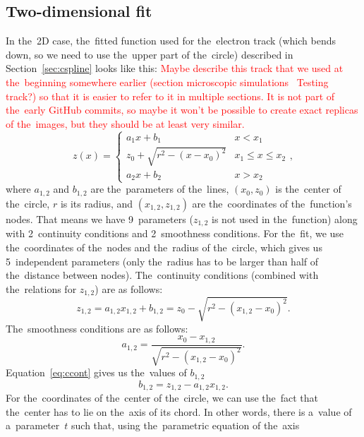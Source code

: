 		\subsection{Two-dimensional fit}
			In the~2D case, the~fitted function used for the~electron track (which bends down, so we need to use the~upper part of the~circle) described in Section~\ref{sec:cspline} looks like this: \textcolor{red}{Maybe describe this track that we used at the~beginning somewhere earlier (section microscopic simulations \textrightarrow~Testing track?) so that it is easier to refer to it in multiple sections. It is not part of the~early GitHub commits, so maybe it won't be possible to create exact replicas of the~images, but they should be at least very similar.}
				\begin{equation}
					\label{eq:clines2d}
					z(x) = \begin{cases}
								a_1x+b_1 & x<x_1\\
								z_0+\sqrt{r^2-(x-x_0)^2} & x_1\leq x\leq x_2\\
								a_2x+b_2 & x>x_2
						   \end{cases},
				\end{equation}
			where $a_{1,2}$ and $b_{1,2}$ are the~parameters of the~lines, $(x_0,z_0)$ is the~center of the~circle, $r$ is its radius, and $(x_{1,2},z_{1,2})$ are the~coordinates of the~function's nodes. That means we have 9~parameters ($z_{1,2}$ is not used in the~function) along with 2~continuity conditions and 2~smoothness conditions. For the~fit, we use the~coordinates of the~nodes and the~radius of the~circle, which gives us 5~independent parameters (only the~radius has to be larger than half of the~distance between nodes). The~continuity conditions (combined with the~relations for $z_{1,2}$) are as follows:
				\begin{equation}
					\label{eq:ccont}
					z_{1,2} = a_{1,2}x_{1,2}+b_{1,2} = z_0-\sqrt{r^2-(x_{1,2}-x_0)^2}.
				\end{equation}
			The~smoothness conditions are as follows:
				\begin{equation}
					\label{eq:a12}
					a_{1,2} = \frac{x_0-x_{1,2}}{\sqrt{r^2-(x_{1,2}-x_0)^2}}.
				\end{equation}
			Equation~\ref{eq:ccont} gives us the~values of $b_{1,2}$
				\begin{equation}
					\label{eq:b12}
					b_{1,2} = z_{1,2} - a_{1,2} x_{1,2}.
				\end{equation}
			For the~coordinates of the~center of the~circle, we can use the~fact that the~center has to lie on the~axis of its chord. In other words, there is a~value of a~parameter~$t$ such that, using the~parametric equation of the~axis
